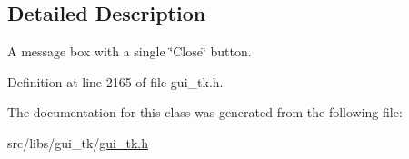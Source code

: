 \subsection{Detailed Description}
A message box with a single \char`\"{}\-Close\char`\"{} button. 

Definition at line 2165 of file gui\-\_\-tk.\-h.



The documentation for this class was generated from the following file\-:\begin{DoxyCompactItemize}
\item 
src/libs/gui\-\_\-tk/\hyperlink{gui__tk_8h}{gui\-\_\-tk.\-h}\end{DoxyCompactItemize}
